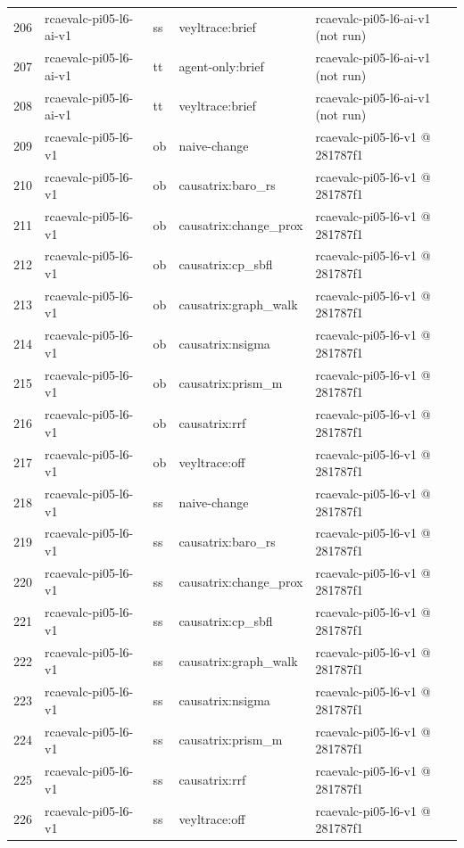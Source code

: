 \begin{longtable}{@{}r>{\raggedright\arraybackslash}p{87.0pt}>{\raggedright\arraybackslash}p{18.0pt}>{\raggedright\arraybackslash}p{63.0pt}>{\raggedright\arraybackslash}p{108.0pt}@{}}
206 & rcaevalc-pi05-l6-ai-v1 & ss & veyltrace:brief & rcaevalc-pi05-l6-ai-v1 (not run) \\
207 & rcaevalc-pi05-l6-ai-v1 & tt & agent-only:brief & rcaevalc-pi05-l6-ai-v1 (not run) \\
208 & rcaevalc-pi05-l6-ai-v1 & tt & veyltrace:brief & rcaevalc-pi05-l6-ai-v1 (not run) \\
209 & rcaevalc-pi05-l6-v1 & ob & naive-change & rcaevalc-pi05-l6-v1 @ 281787f1 \\
210 & rcaevalc-pi05-l6-v1 & ob & causatrix:baro\_rs & rcaevalc-pi05-l6-v1 @ 281787f1 \\
211 & rcaevalc-pi05-l6-v1 & ob & causatrix:change\_prox & rcaevalc-pi05-l6-v1 @ 281787f1 \\
212 & rcaevalc-pi05-l6-v1 & ob & causatrix:cp\_sbfl & rcaevalc-pi05-l6-v1 @ 281787f1 \\
213 & rcaevalc-pi05-l6-v1 & ob & causatrix:graph\_walk & rcaevalc-pi05-l6-v1 @ 281787f1 \\
214 & rcaevalc-pi05-l6-v1 & ob & causatrix:nsigma & rcaevalc-pi05-l6-v1 @ 281787f1 \\
215 & rcaevalc-pi05-l6-v1 & ob & causatrix:prism\_m & rcaevalc-pi05-l6-v1 @ 281787f1 \\
216 & rcaevalc-pi05-l6-v1 & ob & causatrix:rrf & rcaevalc-pi05-l6-v1 @ 281787f1 \\
217 & rcaevalc-pi05-l6-v1 & ob & veyltrace:off & rcaevalc-pi05-l6-v1 @ 281787f1 \\
218 & rcaevalc-pi05-l6-v1 & ss & naive-change & rcaevalc-pi05-l6-v1 @ 281787f1 \\
219 & rcaevalc-pi05-l6-v1 & ss & causatrix:baro\_rs & rcaevalc-pi05-l6-v1 @ 281787f1 \\
220 & rcaevalc-pi05-l6-v1 & ss & causatrix:change\_prox & rcaevalc-pi05-l6-v1 @ 281787f1 \\
221 & rcaevalc-pi05-l6-v1 & ss & causatrix:cp\_sbfl & rcaevalc-pi05-l6-v1 @ 281787f1 \\
222 & rcaevalc-pi05-l6-v1 & ss & causatrix:graph\_walk & rcaevalc-pi05-l6-v1 @ 281787f1 \\
223 & rcaevalc-pi05-l6-v1 & ss & causatrix:nsigma & rcaevalc-pi05-l6-v1 @ 281787f1 \\
224 & rcaevalc-pi05-l6-v1 & ss & causatrix:prism\_m & rcaevalc-pi05-l6-v1 @ 281787f1 \\
225 & rcaevalc-pi05-l6-v1 & ss & causatrix:rrf & rcaevalc-pi05-l6-v1 @ 281787f1 \\
226 & rcaevalc-pi05-l6-v1 & ss & veyltrace:off & rcaevalc-pi05-l6-v1 @ 281787f1 \\

\end{longtable}
